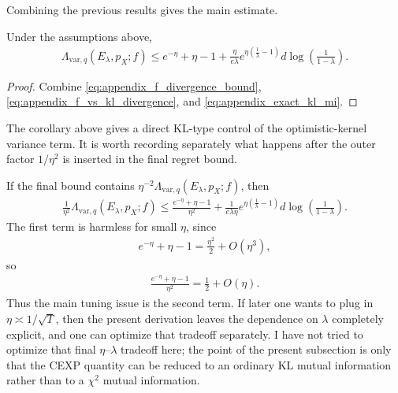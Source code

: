 Combining the previous results gives the main estimate.

\begin{corollary}
\label{cor:appendix_main_lambda_var_bound}
Under the assumptions above,
\begin{align}
    \Lambda_{\mathrm{var}, q}(E_\lambda, p_X; f)
    \leq
    e^{-\eta} + \eta - 1
    + \frac{\eta}{e\lambda}e^{\eta(\frac{1}{\lambda}-1)}
    d\log\left(\frac{1}{1-\lambda}\right).
    \label{eq:appendix_main_lambda_var_bound}
\end{align}
\end{corollary}

\begin{proof}
Combine \eqref{eq:appendix_f_divergence_bound}, \eqref{eq:appendix_f_vs_kl_divergence}, and \eqref{eq:appendix_exact_kl_mi}.
\end{proof}

The corollary above gives a direct KL-type control of the optimistic-kernel variance term.
It is worth recording separately what happens after the outer factor $1/\eta^2$ is inserted in the final regret bound.

\begin{remark}
\label{rem:appendix_eta_squared}
If the final bound contains $\eta^{-2}\Lambda_{\mathrm{var}, q}(E_\lambda, p_X; f)$, then
\begin{align}
    \frac{1}{\eta^2}\Lambda_{\mathrm{var}, q}(E_\lambda, p_X; f)
    \leq
    \frac{e^{-\eta} + \eta - 1}{\eta^2}
    + \frac{1}{e\lambda\eta}e^{\eta(\frac{1}{\lambda}-1)}
    d\log\left(\frac{1}{1-\lambda}\right).
    \label{eq:appendix_eta_squared_bound}
\end{align}
The first term is harmless for small $\eta$, since
\begin{align*}
    e^{-\eta} + \eta - 1 = \frac{\eta^2}{2} + O(\eta^3),
\end{align*}
so
\begin{align*}
    \frac{e^{-\eta} + \eta - 1}{\eta^2} = \frac{1}{2} + O(\eta).
\end{align*}
Thus the main tuning issue is the second term.
If later one wants to plug in $\eta \asymp 1/\sqrt{T}$, then the present derivation leaves the dependence on
$\lambda$ completely explicit, and one can optimize that tradeoff separately.
I have not tried to optimize that final $\eta$--$\lambda$ tradeoff here; the point of the present subsection is only that the CEXP quantity can be reduced to an ordinary KL mutual information rather than to a $\chi^2$ mutual information.
\end{remark}

